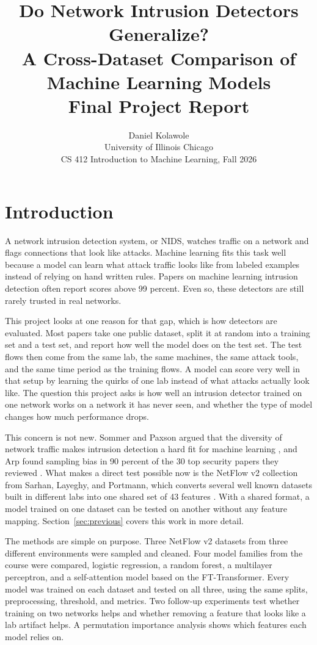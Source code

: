 \documentclass[10pt,twocolumn,letterpaper]{article}
\title{Do Network Intrusion Detectors Generalize?\\A Cross-Dataset Comparison of Machine Learning Models\\[4pt]\large Final Project Report}
\author{Daniel Kolawole\\
University of Illinois Chicago\\
CS 412 Introduction to Machine Learning, Fall 2026}
\begin{document}
\maketitle

\begin{abstract}
\ABSTRACT
\end{abstract}

\section{Introduction}

A network intrusion detection system, or NIDS, watches traffic on a network and flags connections that look like attacks. Machine learning fits this task well because a model can learn what attack traffic looks like from labeled examples instead of relying on hand written rules. Papers on machine learning intrusion detection often report scores above 99 percent. Even so, these detectors are still rarely trusted in real networks.

This project looks at one reason for that gap, which is how detectors are evaluated. Most papers take one public dataset, split it at random into a training set and a test set, and report how well the model does on the test set. The test flows then come from the same lab, the same machines, the same attack tools, and the same time period as the training flows. A model can score very well in that setup by learning the quirks of one lab instead of what attacks actually look like. The question this project asks is how well an intrusion detector trained on one network works on a network it has never seen, and whether the type of model changes how much performance drops.

This concern is not new. Sommer and Paxson argued that the diversity of network traffic makes intrusion detection a hard fit for machine learning \cite{sommer2010}, and Arp \etal found sampling bias in 90 percent of the 30 top security papers they reviewed \cite{arp2022}. What makes a direct test possible now is the NetFlow v2 collection from Sarhan, Layeghy, and Portmann, which converts several well known datasets built in different labs into one shared set of 43 features \cite{sarhan2022}. With a shared format, a model trained on one dataset can be tested on another without any feature mapping. Section~\ref{sec:previous} covers this work in more detail.

The methods are simple on purpose. Three NetFlow v2 datasets from three different environments were sampled and cleaned. Four model families from the course were compared, logistic regression, a random forest, a multilayer perceptron, and a self-attention model based on the FT-Transformer. Every model was trained on each dataset and tested on all three, using the same splits, preprocessing, threshold, and metrics. Two follow-up experiments test whether training on two networks helps and whether removing a feature that looks like a lab artifact helps. A permutation importance analysis shows which features each model relies on.
\end{document}
